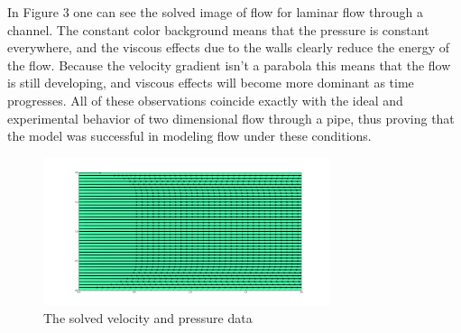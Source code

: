 \documentclass[12pt]{article}
\begin{document}
In Figure 3 one can see the solved image of flow for laminar flow through a channel. The constant color background means 
that the pressure is constant everywhere, and the viscous effects due to the walls clearly reduce the energy of the 
flow. Because the velocity gradient isn't a parabola this means that the flow is still developing, and viscous effects 
will become more dominant as time progresses. All of these observations coincide exactly with the ideal and 
experimental behavior of two dimensional flow through a pipe, thus proving that the model was successful in modeling 
flow under these conditions.
\begin{figure}[h]
\centering
\caption{The solved velocity and pressure data}
\includegraphics[width=0.75\textwidth]{solvedFlow2.png}
\end{figure}
\end{document}
